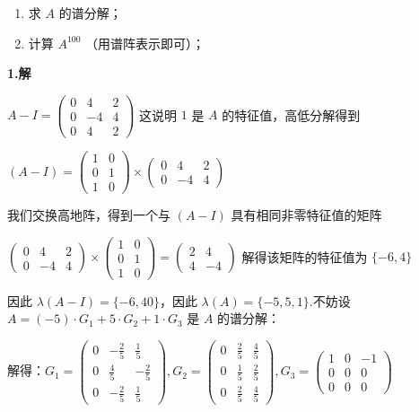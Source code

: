 \documentclass{article}
\begin{document}
\begin{enumerate}
	\item 求 $A$ 的谱分解；
	\item 计算 $A^{100}$ （用谱阵表示即可）；
\end{enumerate}

\par \textbf{1.解}

$A-I=\begin{pmatrix}
	0 & 4 & 2\\
	0 & -4 & 4\\
	0 & 4 & 2
\end{pmatrix}$ 这说明 $1$ 是 $A$ 的特征值，高低分解得到

$(A-I)=\begin{pmatrix}
	1 & 0\\
	0 & 1\\
	1 & 0
\end{pmatrix} \times \begin{pmatrix}
	0 & 4 & 2\\
	0 & -4 & 4
\end{pmatrix}$

我们交换高地阵，得到一个与 $(A-I)$ 具有相同非零特征值的矩阵

$ \begin{pmatrix}
	0 & 4 & 2\\
	0 & -4 & 4
\end{pmatrix}\times \begin{pmatrix}
1 & 0\\
0 & 1\\
1 & 0
\end{pmatrix}=\begin{pmatrix}
	2 & 4 \\
	4 & -4
\end{pmatrix}$ 解得该矩阵的特征值为 $\{-6, 4\}$

因此 $\lambda(A-I)=\{-6, 4 0\}$，因此 $\lambda(A)=\{-5, 5, 1\}$.不妨设 $A=(-5)\cdot G_1 + 5\cdot G_2 + 1\cdot G_3$ 是 $A$ 的谱分解：

解得：$G_1=\begin{pmatrix}
	0 & -\frac{2}{5} & \frac{1}{5}\\
	0 & \frac{4}{5} & -\frac{2}{5}\\
	0 & -\frac{2}{5} & \frac{1}{5}
\end{pmatrix}, G_2=\begin{pmatrix}
	0 & \frac{2}{5} & \frac{4}{5}\\
	0 & \frac{1}{5} & \frac{2}{5}\\
	0 & \frac{2}{5} & \frac{4}{5}
\end{pmatrix}, G_3=\begin{pmatrix}
	1 & 0 & -1\\
	0 & 0 & 0\\
	0 & 0 & 0
\end{pmatrix}$
\end{document}
